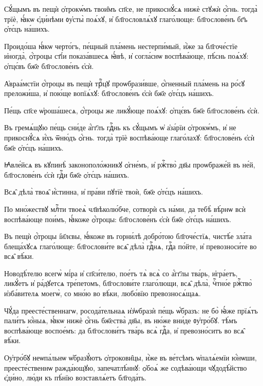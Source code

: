\hKv Сꙋ́щымъ въ пещѝ ѻ҆трокѡ́мъ твои̑мъ сп҃се, не прикоснꙋ́сѧ нижѐ  стꙋжѝ ѻ҆́гнь. тогда̀ трїѐ, ꙗ҆́кѡ є҆ди́нѣми ᲂу҆сты̀ поѧ́хꙋ, и҆  бл҃гословлѧ́хꙋ глаго́люще: бл҃гослове́нъ бг҃ъ ѻ҆тє́цъ на́шихъ. 

\hKv Проидо́ша ꙗ҆́кѡ черто́гъ, пе́щный пла́мень нестерпи́мый, и҆̀же  за бл҃гоче́стїе и҆ногда̀,  ѻ҆́троцы  ст҃і́и показа́вшесѧ ꙗ҆́вѣ, и҆ согла́снѡ воспѣва́юще, пѣ́снь  поѧ́хꙋ: ѻ҆тцє́въ бж҃е бл҃гослове́нъ є҆сѝ. 

\hKv А҆враа́мстїи ѻ҆́троцы въ пещѝ трⷪ҇цꙋ проѡбрази́вше, ѻ҆́гненный  пла́мень на ро́сꙋ преложи́ша, и҆ пою́ще вопїѧ́хꙋ: бл҃гослове́нъ  є҆сѝ бж҃е ѻ҆тє́цъ на́шихъ. 
%

\hKv Пе́щь сп҃се ѡ҆роша́шесѧ, ѻ҆́троцы же ликꙋ́юще поѧ́хꙋ: ѻ҆тцє́въ  бж҃е бл҃гослове́нъ є҆сѝ. 

\hKv Въ гремѧ́щꙋю пе́щь сни́де а҆́гг҃лъ гдⷭ҇нь къ сꙋ́щымъ ѡ҆ а҆за́рїи  ѻ҆трокѡ́мъ, и҆ не прикоснꙋ́сѧ и҆́хъ ѿню́дъ ѻ҆́гнь. тогда̀ трїѐ  воспѣва́юще глаго́лахꙋ: бл҃гослове́нъ є҆сѝ бж҃е ѻ҆тє́цъ на́шихъ. 

\hKv Ꙗ҆вле́йсѧ въ кꙋпинѣ̀ законополо́жникꙋ ѻ҆гне́мъ, и҆ ржⷭ҇тво̀  дв҃ы проѡбраже́й въ не́й, бл҃гослове́нъ є҆сѝ гдⷭ҇и бж҃е ѻ҆тє́цъ  на́шихъ. 

\hKv Всѧ̑ дѣла̀ твоѧ̑ и҆́стинна, и҆ пра́ви пꙋтїѐ твоѝ, бж҃е  ѻ҆тє́цъ на́шихъ.  

\hKv По мно́жествꙋ млⷭ҇ти твоеѧ̀ чл҃вѣколю́бче, сотворѝ съ на́ми, да  тебѣ̀ вѣ́рнѡ всѝ воспѣва́юще пои́мъ, ꙗ҆́коже ѻ҆́троцы:  бл҃гослове́нъ є҆сѝ бж҃е ѻ҆тє́цъ на́шихъ. 
%

\hKv Въ пещѝ ѻ҆́троцы і҆и҃лєвы, ꙗ҆́коже въ горни́лѣ добро́тою  бл҃гоче́стїѧ, чистѣ́е зла́та блеща́хꙋсѧ глаго́люще: бл҃гослови́те  всѧ̑ дѣла̀ гдⷭ҇нѧ, гдⷭ҇а по́йте, и҆ превозноси́те во всѧ̑ вѣ́ки. 

\hKv Новодѣ́телю всегѡ̀ мі́ра и҆ сп҃си́телю, пое́тъ тѧ̀ всѧ̀ со  а҆́гг҃лы тва́рь, и҆гра́етъ, ликꙋ́етъ и҆ ра́дꙋетсѧ тре́петомъ,  бл҃гослови́те глаго́лющи, всѧ̑ дѣла̀, чⷭ҇тно́е ржⷭ҇тво̀  и҆зба́вителѧ моегѡ̀, со мно́ю во вѣ́ки, любо́вїю превозносѧ́щаѧ.  
%

\hKv Чꙋ́да преесте́ственнагѡ, росода́тельнаѧ  и҆з̾ѡбразѝ пе́щь ѡ҆́бразъ: не бо̀ ꙗ҆́же прїѧ́тъ пали́тъ ю҆́ныѧ,  ꙗ҆́кѡ нижѐ ѻ҆́гнь  бж҃ества̀ дв҃ы,  въ ню́же вни́де ᲂу҆тро́бꙋ. тѣ́мъ воспѣва́юще воспое́мъ: да  бл҃гослови́тъ тва́рь всѧ̀ гдⷭ҇а, и҆ превозно́ситъ во всѧ̑ вѣ́ки. 

\hKv Оу҆тро́бꙋ неѡпа́льнѡ ѡ҆бразꙋ́ютъ ѻ҆трокови̑цы, и҆̀же въ  ве́тсѣмъ ѡ҆палѧ́емїи ю҆́нѡши, преесте́ственнѡ ражда́ющꙋю,  запечатлѣ́ннꙋ: ѻ҆боѧ́ же содѣва́ющи чꙋдодѣ́йство є҆ди́но, лю́ди  къ пѣ́нїю возставлѧ́етъ бл҃года́ть. 
%

